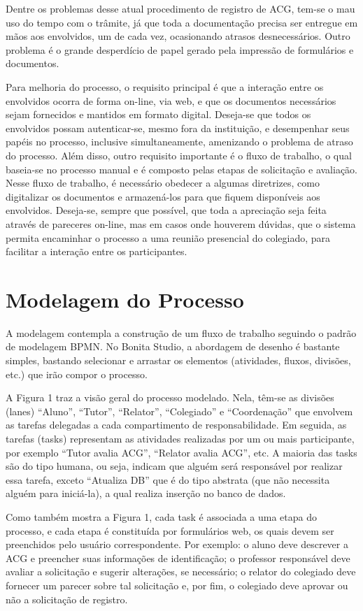 \documentclass[12pt]{article}
\begin{document}
Dentre os problemas desse atual procedimento de registro de ACG, tem-se o mau uso do tempo com o trâmite, já que toda a documentação precisa ser entregue em mãos aos envolvidos, um de cada vez, ocasionando atrasos desnecessários. Outro problema é o grande desperdício de papel gerado pela impressão de formulários e documentos.

Para melhoria do processo, o requisito principal é que a interação entre os envolvidos ocorra de forma on-line, via web, e que os documentos necessários sejam fornecidos e mantidos em formato digital. Deseja-se que todos os envolvidos possam autenticar-se, mesmo fora da instituição, e desempenhar seus papéis no processo, inclusive simultaneamente, amenizando o problema de atraso do processo. Além disso, outro requisito importante é o fluxo de trabalho, o qual baseia-se no processo manual e é composto pelas etapas de solicitação e avaliação. Nesse fluxo de trabalho, é necessário obedecer a algumas diretrizes, como digitalizar os documentos e armazená-los para que fiquem disponíveis aos envolvidos. Deseja-se, sempre que possível, que toda a apreciação seja feita através de pareceres on-line, mas em casos onde houverem dúvidas, que o sistema permita encaminhar o processo a uma reunião presencial do colegiado, para facilitar a interação entre os participantes.

\section{Modelagem do Processo}

A modelagem contempla a construção de um fluxo de trabalho seguindo o padrão de modelagem BPMN. No Bonita Studio, a abordagem de desenho é bastante simples, bastando selecionar e arrastar os elementos (atividades, fluxos, divisões, etc.) que irão compor o processo.

	A Figura 1 traz a visão geral do processo modelado. Nela, têm-se as divisões (lanes) “Aluno”, “Tutor”, “Relator”, “Colegiado” e “Coordenação” que envolvem as tarefas delegadas a cada compartimento de responsabilidade. Em seguida, as tarefas  (tasks)  representam as atividades realizadas por um ou mais participante, por exemplo “Tutor avalia ACG”, “Relator avalia ACG”, etc. A maioria das tasks são  do tipo humana, ou seja, indicam que alguém será responsável por realizar essa tarefa, exceto “Atualiza DB” que é do tipo abstrata (que não necessita alguém para iniciá-la), a qual realiza inserção no banco de dados.

Como também mostra a Figura 1, cada  task  é associada a uma etapa do processo, e cada etapa é constituída  por formulários web, os quais devem ser preenchidos pelo usuário correspondente. Por exemplo: o aluno deve  descrever  a ACG e preencher  suas  informações  de  identificação;  o professor responsável deve avaliar a solicitação e sugerir alterações, se necessário; o relator do colegiado deve fornecer um parecer sobre tal solicitação e, por fim, o colegiado deve aprovar ou não a solicitação de registro.
\end{document}
